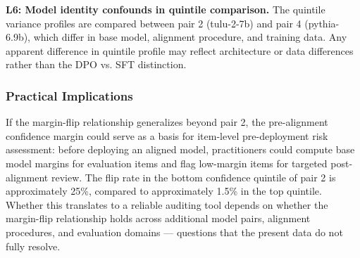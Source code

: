 \textbf{L6: Model identity confounds in quintile comparison.} The quintile variance profiles are compared between pair 2 (tulu-2-7b) and pair 4 (pythia-6.9b), which differ in base model, alignment procedure, and training data. Any apparent difference in quintile profile may reflect architecture or data differences rather than the DPO vs. SFT distinction.

\subsubsection{Practical Implications}

If the margin-flip relationship generalizes beyond pair 2, the pre-alignment confidence margin could serve as a basis for item-level pre-deployment risk assessment: before deploying an aligned model, practitioners could compute base model margins for evaluation items and flag low-margin items for targeted post-alignment review. The flip rate in the bottom confidence quintile of pair 2 is approximately 25\%, compared to approximately 1.5\% in the top quintile. Whether this translates to a reliable auditing tool depends on whether the margin-flip relationship holds across additional model pairs, alignment procedures, and evaluation domains --- questions that the present data do not fully resolve.

